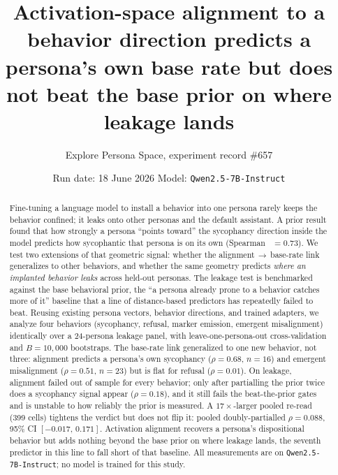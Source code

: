 \documentclass[11pt]{article}
\title{\vspace{-2.5em}Activation-space alignment to a behavior direction predicts a
persona's own base rate but does not beat the base prior on where leakage lands}
\author{Explore Persona Space, experiment record \#657}
\date{Run date: 18 June 2026 \quad\textbar\quad Model: \texttt{Qwen2.5-7B-Instruct}}
\begin{document}
\maketitle
\vspace{-1.5em}

\begin{abstract}
\noindent
Fine-tuning a language model to install a behavior into one persona rarely keeps
the behavior confined; it leaks onto other personas and the default assistant.
A prior result found that how strongly a persona ``points toward'' the
sycophancy direction inside the model predicts how sycophantic that persona is on
its own (Spearman \rho{}~$=0.73$). We test two extensions of that geometric
signal: whether the alignment\,$\to$\,base-rate link generalizes to other
behaviors, and whether the same geometry predicts \emph{where an implanted
behavior leaks} across held-out personas. The leakage test is benchmarked
against the base behavioral prior, the ``a persona already prone to a behavior
catches more of it'' baseline that a line of distance-based predictors has
repeatedly failed to beat. Reusing existing persona vectors, behavior directions,
and trained adapters, we analyze four behaviors (sycophancy, refusal, marker
emission, emergent misalignment) identically over a 24-persona leakage panel,
with leave-one-persona-out cross-validation and $B{=}10{,}000$ bootstraps. The
base-rate link generalized to one new behavior, not three: alignment predicts a
persona's own sycophancy ($\rho{=}0.68$, $n{=}16$) and emergent misalignment
($\rho{=}0.51$, $n{=}23$) but is flat for refusal ($\rho{=}0.01$). On leakage,
alignment failed out of sample for every behavior; only after partialling the
prior twice does a sycophancy signal appear ($\rho{=}0.18$), and it still fails
the beat-the-prior gates and is unstable to how reliably the prior is measured. A
$17\times$-larger pooled re-read (399 cells) tightens the verdict but does not
flip it: pooled doubly-partialled $\rho{=}0.088$, 95\% CI $[-0.017,\,0.171]$.
Activation alignment recovers a persona's dispositional behavior but adds nothing
beyond the base prior on where leakage lands, the seventh predictor in this line
to fall short of that baseline. All measurements are on
\texttt{Qwen2.5-7B-Instruct}; no model is trained for this study.
\end{abstract}
\end{document}
